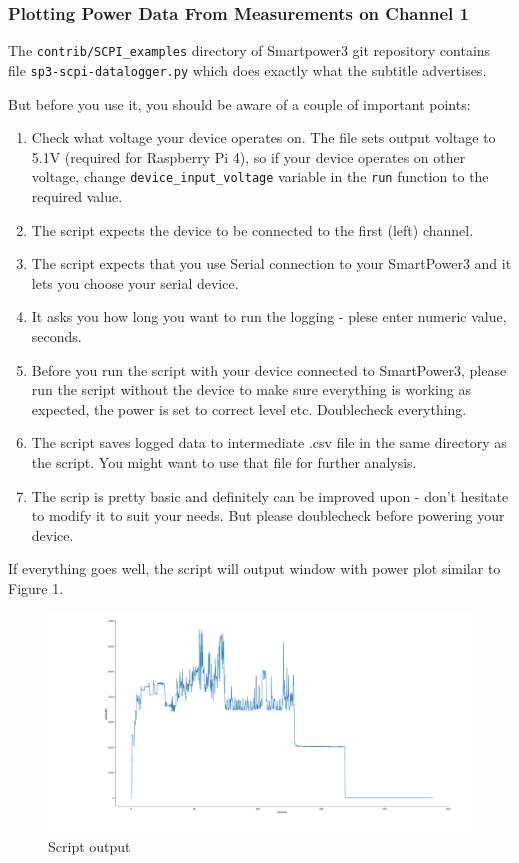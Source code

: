 \documentclass[a4paper,10pt]{article}
\begin{document}
\subsubsection{Plotting Power Data From Measurements on Channel 1}
    The \verb|contrib/SCPI_examples| directory of Smartpower3 git repository contains file\newline
    \verb|sp3-scpi-datalogger.py| which does exactly what the subtitle advertises.
    
    But before you use it, you should be aware of a couple of important points:
    \begin{enumerate}
        \item 
            Check what voltage your device operates on. The file sets output voltage to 5.1V (required for Raspberry Pi 4), so if your device operates on other voltage, change \verb|device_input_voltage| variable in the \verb|run| function to the required value.
        \item 
            The script expects the device to be connected to the first (left) channel.
        \item 
            The script expects that you use Serial connection to your SmartPower3 and it lets you choose your serial device.
        \item
            It asks you how long you want to run the logging - plese enter numeric value, seconds.
        \item
            Before you run the script with your device connected to SmartPower3, please run the script without the device to make sure everything is working as expected, the power is set to correct level etc. Doublecheck everything.
        \item 
            The script saves logged data to intermediate .csv file in the same directory as the script. You might want to use that file for further analysis.
        \item 
            The scrip is pretty basic and definitely can be improved upon - don't hesitate to modify it to suit your needs. But please doublecheck before powering your device.
    \end{enumerate}
    If everything goes well, the script will output window with power plot similar to Figure 1.
    \begin{figure}
        \begin{center}
            \includegraphics[scale=0.24]{Figure_1.png}
            \caption{Script output}
        \end{center}
    \end{figure}
    
\end{document}
